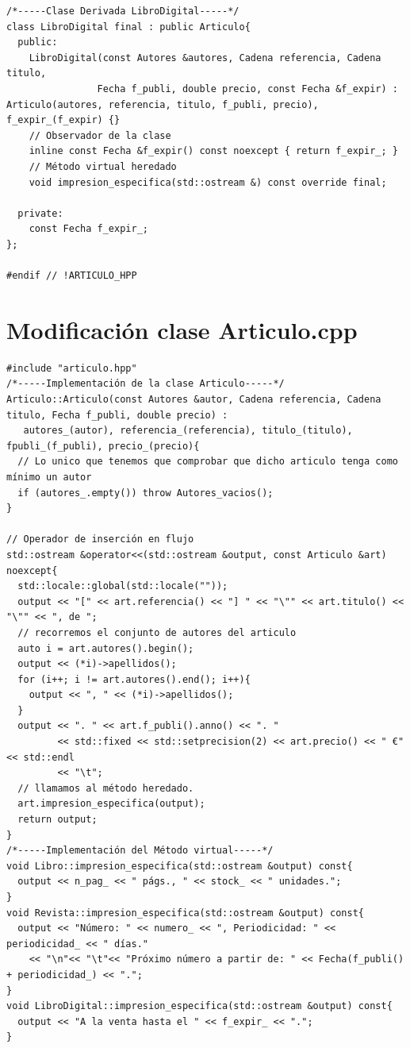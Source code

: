 \begin{verbatim}
/*-----Clase Derivada LibroDigital-----*/
class LibroDigital final : public Articulo{
  public:
    LibroDigital(const Autores &autores, Cadena referencia, Cadena titulo,
                Fecha f_publi, double precio, const Fecha &f_expir) : Articulo(autores, referencia, titulo, f_publi, precio), f_expir_(f_expir) {}
    // Observador de la clase
    inline const Fecha &f_expir() const noexcept { return f_expir_; }
    // Método virtual heredado
    void impresion_especifica(std::ostream &) const override final;

  private:
    const Fecha f_expir_;
};

#endif // !ARTICULO_HPP
\end{verbatim}
\section{Modificación clase Articulo.cpp}
\begin{verbatim}
#include "articulo.hpp"
/*-----Implementación de la clase Articulo-----*/
Articulo::Articulo(const Autores &autor, Cadena referencia, Cadena titulo, Fecha f_publi, double precio) :
   autores_(autor), referencia_(referencia), titulo_(titulo), fpubli_(f_publi), precio_(precio){
  // Lo unico que tenemos que comprobar que dicho articulo tenga como mínimo un autor
  if (autores_.empty()) throw Autores_vacios();
}

// Operador de inserción en flujo
std::ostream &operator<<(std::ostream &output, const Articulo &art) noexcept{
  std::locale::global(std::locale(""));
  output << "[" << art.referencia() << "] " << "\"" << art.titulo() << "\"" << ", de ";
  // recorremos el conjunto de autores del articulo
  auto i = art.autores().begin();
  output << (*i)->apellidos();
  for (i++; i != art.autores().end(); i++){
    output << ", " << (*i)->apellidos();
  }
  output << ". " << art.f_publi().anno() << ". "
         << std::fixed << std::setprecision(2) << art.precio() << " €" << std::endl
         << "\t";
  // llamamos al método heredado.
  art.impresion_especifica(output);
  return output;
}
/*-----Implementación del Método virtual-----*/
void Libro::impresion_especifica(std::ostream &output) const{
  output << n_pag_ << " págs., " << stock_ << " unidades.";
}
void Revista::impresion_especifica(std::ostream &output) const{
  output << "Número: " << numero_ << ", Periodicidad: " << periodicidad_ << " días."
    << "\n"<< "\t"<< "Próximo número a partir de: " << Fecha(f_publi() + periodicidad_) << ".";
}
void LibroDigital::impresion_especifica(std::ostream &output) const{
  output << "A la venta hasta el " << f_expir_ << ".";
}
\end{verbatim}

